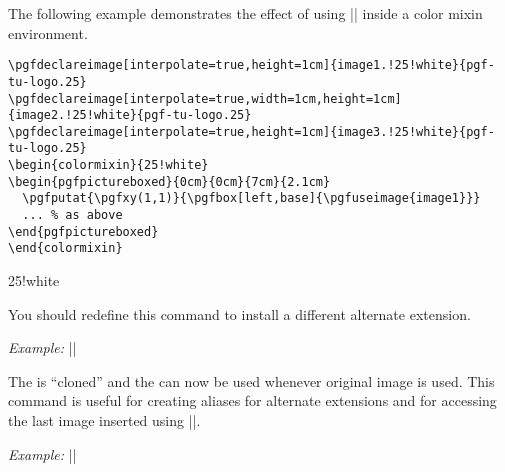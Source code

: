 \documentclass{ltxdoc}
\def\example{\par\smallskip\noindent\textit{Example: }}
\begin{document}
\begin{command}{\pgfuseimage{}}
\begin{pgfpictureboxed}{0cm}{0cm}{7cm}{2.1cm}
\end{pgfpictureboxed}

  The following example demonstrates the effect of using
  |\pgfuseimage| inside a color mixin environment.

\begin{verbatim}
\pgfdeclareimage[interpolate=true,height=1cm]{image1.!25!white}{pgf-tu-logo.25}
\pgfdeclareimage[interpolate=true,width=1cm,height=1cm]{image2.!25!white}{pgf-tu-logo.25}
\pgfdeclareimage[interpolate=true,height=1cm]{image3.!25!white}{pgf-tu-logo.25}
\begin{colormixin}{25!white}
\begin{pgfpictureboxed}{0cm}{0cm}{7cm}{2.1cm}
  \pgfputat{\pgfxy(1,1)}{\pgfbox[left,base]{\pgfuseimage{image1}}}
  ... % as above
\end{pgfpictureboxed}
\end{colormixin}
\end{verbatim}

\begin{colormixin}{25!white}
\begin{pgfpictureboxed}{0cm}{0cm}{7cm}{2.1cm}


\end{pgfpictureboxed}
\end{colormixin}
\end{command}

\begin{command}{\pgfalternateextension}
  You should redefine this command to install a different alternate
  extension.

  \example |\def\pgfalternateextension{!25!white}|
\end{command}

\begin{command}{\pgfaliasimage{}}
  The  is ``cloned'' and the  can now be used whenever original image is used. This
  command is useful for creating aliases for alternate extensions
  and for accessing the last image inserted using |\pgfimage|.
  \example ||
\end{command}
\end{document}
